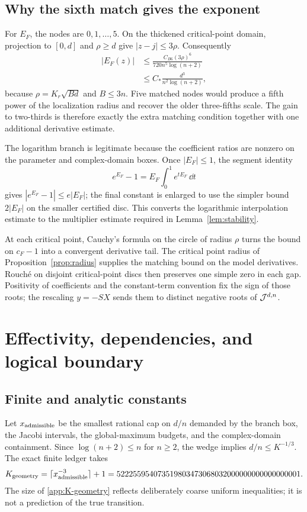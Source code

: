 \subsection{Why the sixth match gives the exponent}

For $E_F$, the nodes are $0,1,\ldots,5$.  On the thickened critical-point
domain, projection to $[0,d]$ and $\rho\ge d$ give $|z-j|\le3\rho$.
Consequently
\begin{align*}
 |E_F(z)|
 &\le\frac{C_{B6}(3\rho)^6}{720n^5\log(n+2)}\\
 &\le C_\ast\frac{d^3}{n^2\log(n+2)},
\end{align*}
because $\rho=K_r\sqrt{Bd}$ and $B\le3n$.  Five matched nodes would produce
a fifth power of the localization radius and recover the older three-fifths
scale.  The gain to two-thirds is therefore exactly the extra matching
condition together with one additional derivative estimate.

The logarithm branch is legitimate because the coefficient ratios are
nonzero on the parameter and complex-domain boxes.  Once $|E_F|\le1$, the
segment identity
\[
 e^{E_F}-1=E_F\int_0^1e^{tE_F}\,\dd t
\]
gives $|e^{E_F}-1|\le e|E_F|$; the final constant is enlarged to use the
simpler bound $2|E_F|$ on the smaller certified disc.  This converts the
logarithmic interpolation estimate to the multiplier estimate required in
Lemma~\ref{lem:stability}.

At each critical point, Cauchy's formula on the circle of radius $\rho$
turns the bound on $c_F-1$ into a convergent derivative tail.  The critical
point radius of Proposition~\ref{prop:radius} supplies the matching bound on
the model derivatives.  Rouch\'e on disjoint critical-point discs then
preserves one simple zero in each gap.  Positivity of coefficients and the
constant-term convention fix the sign of those roots; the rescaling
$y=-SX$ sends them to distinct negative roots of $\mathcal J^{d,n}$.

\section{Effectivity, dependencies, and logical boundary}\label{app:effectivity-details}

\subsection{Finite and analytic constants}

Let $x_{\rm admissible}$ be the smallest rational cap on $d/n$ demanded by
the branch box, the Jacobi intervals, the global-maximum budgets, and the
complex-domain containment.  Since $\log(n+2)\le n$ for $n\ge2$, the wedge
implies $d/n\le K^{-1/3}$.  The exact finite ledger takes
\begin{equation}\label{app:K-geometry}
 K_{\rm geometry}
 =\lceil x_{\rm admissible}^{-3}\rceil+1
 =522255954073519803473068032000000000000000001.
\end{equation}
The size of \eqref{app:K-geometry} reflects deliberately coarse uniform
inequalities; it is not a prediction of the true transition.


